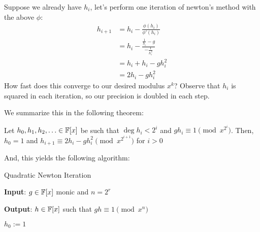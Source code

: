 Suppose we already have $h_i$, let's perform one iteration of newton's method with the above $\phi$:
\begin{align*}
    h_{i + 1} &= h_i - \frac{\phi(h_i)}{\phi'(h_i)} \\
    &= h_i - \frac{\frac{1}{h_i} - g}{-\frac{1}{h_i^2}} \\
    &= h_i + h_i - gh_i^2 \\
    &= 2h_i - gh_i^2
\end{align*}
How fast does this converge to our desired modulus $x^k$?
Observe that $h_i$ is squared in each iteration, so our precision is doubled in each step.

We summarize this in the following theorem:
\begin{theorem}{}{}
    Let $h_0, h_1, h_2, \ldots \in \operatorname{\mathbb{F}}[x]$ be such that $\deg h_i < 2^i$ and $gh_i \equiv 1 \pmod{x^{2^i}}$.
    Then, $h_0 = 1$ and $h_{i + 1} \equiv 2h_i - gh_i^2 \pmod{x^{2^{i+1}}}$ for $i > 0$
\end{theorem}
And, this yields the following algorithm:

\begin{algorithm}[H]
    \caption{Quadratic Newton Iteration}\label{alg:quadratic-newton-iteration}
    
    \textbf{Input}: $g \in \operatorname{\mathbb{F}}[x]$ monic and $n = 2^r$
    
    \textbf{Output}: $h \in \operatorname{\mathbb{F}}[x]$ such that $gh \equiv 1 \pmod{x^n}$

    \BlankLine
    \nl $h_0 :=  1$

    \nl {}
\end{algorithm}

